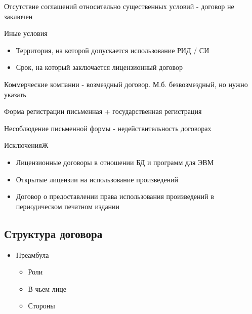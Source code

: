 \documentclass[12pt]{article}
\begin{document}
Отсутствие соглашений относительно существенных условий - договор не заключен

Иные условия
\begin{itemize}
  \item Территория, на которой допускается использование РИД / СИ
  \item Срок, на который заключается лицензионный договор
\end{itemize}

Коммерческие компании - возмездный договор. М.б. безвозмездный, но нужно указать

Форма регистрации письменная + государственная регистрация

Несоблюдение письменной формы - недействительность договорах

ИсключенияЖ
\begin{itemize}
  \item Лицензионные договоры в отношении БД и программ для ЭВМ
  \item Открытые лицензии на использование произведений
  \item Договор о предоставлении права использования произведений в периодическом печатном издании
\end{itemize}


\subsection{Структура договора}
\begin{itemize}
  \item Преамбула
  \begin{itemize}
    \item Роли
    \item В чьем лице
    \item Стороны
  \end{itemize}
\end{itemize}
\end{document}
